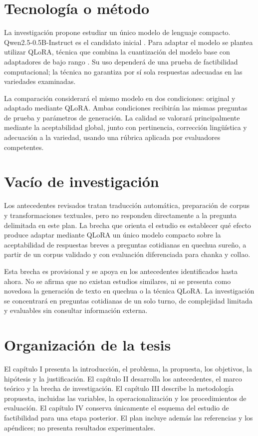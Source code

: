 \section{Tecnología o método}\label{tecnologia-metodo}

La investigación propone estudiar un único modelo de lenguaje compacto. Qwen2.5-0.5B-Instruct es el candidato inicial \parencite{QwenCard2024}. Para adaptar el modelo se plantea utilizar QLoRA, técnica que combina la cuantización del modelo base con adaptadores de bajo rango \parencite{Dettmers2023}. Su uso dependerá de una prueba de factibilidad computacional; la técnica no garantiza por sí sola respuestas adecuadas en las variedades examinadas.

La comparación considerará el mismo modelo en dos condiciones: original y adaptado mediante QLoRA. Ambas condiciones recibirán las mismas preguntas de prueba y parámetros de generación. La calidad se valorará principalmente mediante la aceptabilidad global, junto con pertinencia, corrección lingüística y adecuación a la variedad, usando una rúbrica aplicada por evaluadores competentes.

\section{Vacío de investigación}\label{vacio-investigacion}

Los antecedentes revisados tratan traducción automática, preparación de corpus y transformaciones textuales, pero no responden directamente a la pregunta delimitada en este plan. La brecha que orienta el estudio es establecer qué efecto produce adaptar mediante QLoRA un único modelo compacto sobre la aceptabilidad de respuestas breves a preguntas cotidianas en quechua sureño, a partir de un corpus validado y con evaluación diferenciada para chanka y collao.

Esta brecha es provisional y se apoya en los antecedentes identificados hasta ahora. No se afirma que no existan estudios similares, ni se presenta como novedosa la generación de texto en quechua o la técnica QLoRA. La investigación se concentrará en preguntas cotidianas de un solo turno, de complejidad limitada y evaluables sin consultar información externa.



\section{Organización de la tesis}\label{organizacion-de-la-tesis}

El capítulo I presenta la introducción, el problema, la propuesta, los objetivos, la hipótesis y la justificación. El capítulo II desarrolla los antecedentes, el marco teórico y la brecha de investigación. El capítulo III describe la metodología propuesta, incluidas las variables, la operacionalización y los procedimientos de evaluación. El capítulo IV conserva únicamente el esquema del estudio de factibilidad para una etapa posterior. El plan incluye además las referencias y los apéndices; no presenta resultados experimentales.
